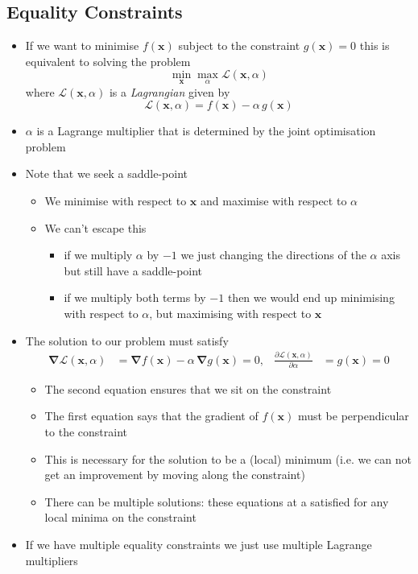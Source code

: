 \documentclass[11pt]{article}
\newcommand{\grad}{\bm{\nabla}}
\begin{document}
\subsection{Equality Constraints}
\label{sec:org51f0e69}
\begin{itemize}
\item If we want to minimise \(f(\bm{x})\) subject to the constraint
\(g(\bm{x})=0\) this is equivalent to solving the problem
$$ \min_{\bm{x}} \max_{\alpha} \mathcal{L}(\bm{x},\alpha) $$
where \(\mathcal{L}(\bm{x},\alpha)\) is a \emph{Lagrangian} given by
$$ \mathcal{L}(\bm{x},\alpha) = f(\bm{x}) - \alpha\,g(\bm{x}) $$
\item \(\alpha\) is a Lagrange multiplier that is determined by the joint
optimisation problem
\item Note that we seek a saddle-point
\begin{itemize}
\item We minimise with respect to \(\bm{x}\) and maximise with respect
to \(\alpha\)
\item We can't escape this
\begin{itemize}
\item if we multiply \(\alpha\) by \(-1\) we just changing the directions
of the \(\alpha\) axis but still have a saddle-point
\item if we multiply both terms by \(-1\) then we would end up
minimising with respect to \(\alpha\), but maximising with
respect to \(\bm{x}\)
\end{itemize}
\end{itemize}
\item The solution to our problem must satisfy
\begin{align*}
\grad  \mathcal{L}(\bm{x},\alpha) &=
\grad f(\bm{x}) - \alpha\,\grad g(\bm{x}) = 0, &
\frac{\partial \mathcal{L}(\bm{x},\alpha)}{\partial \alpha} &=
g(\bm{x}) = 0
\end{align*}
\begin{itemize}
\item The second equation ensures that we sit on the constraint
\item The first equation says that the gradient of \(f(\bm{x})\) must be
perpendicular to the constraint
\item This is necessary for the solution to be a (local) minimum
(i.e. we can not get an improvement by moving along the constraint)
\item There can be multiple solutions: these equations at a satisfied
for any local minima on the constraint
\end{itemize}
\item If we have multiple equality constraints we just use multiple
Lagrange multipliers
\end{itemize}
\end{document}
